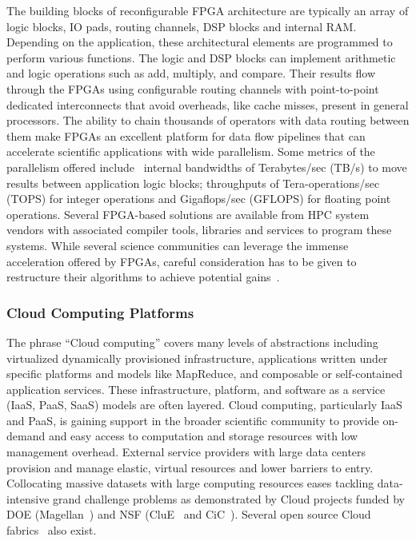 The building blocks of reconfigurable FPGA architecture are typically an array of logic blocks,
IO pads, routing channels, DSP blocks and internal RAM. Depending on the application, these
architectural elements are programmed to perform various functions. The logic and DSP blocks can
implement arithmetic and logic operations such as add, multiply, and compare. Their results flow
through the FPGAs using configurable routing channels with point-to-point dedicated interconnects
that avoid overheads, like cache misses, present in general processors. The ability to chain thousands
of operators with data routing between them make FPGAs an excellent platform for data flow
pipelines that can accelerate scientific applications with wide parallelism. 
Some metrics of the parallelism offered include~\cite{HPCFPGA} internal bandwidths of Terabytes/sec (TB/s) to move results between application logic blocks; throughputs of Tera-operations/sec (TOPS) for integer operations and Gigaflops/sec (GFLOPS) for floating point operations.
Several FPGA-based solutions are available from
HPC system vendors \cite{FPGA-Vendors} with associated 
compiler tools, libraries and services to program these systems. While several
science communities can leverage the immense acceleration offered by FPGAs, careful
consideration has to be given to restructure their algorithms to achieve potential
gains~\cite{Storaasli2007,Fu2009,Shafer2010,Convey,Baker2007,Yi2010,Putnam2009,Ganegedara2010,Hua2008}.


\subsubsection{Cloud Computing Platforms}
The phrase ``Cloud computing'' covers many levels of abstractions including virtualized dynamically
provisioned infrastructure, applications written under specific platforms and models like MapReduce,
and composable or self-contained application services. 
These infrastructure, platform, and software
as a service (IaaS, PaaS, SaaS) models are often layered. 
Cloud computing, particularly IaaS and
PaaS, is gaining support in the broader scientific community to provide on-demand and easy access
to computation and storage resources with low management overhead. 
External service providers with large data centers provision and manage elastic, 
virtual resources and lower barriers to entry.
Collocating massive datasets with large computing resources eases tackling
data-intensive grand challenge problems as demonstrated by Cloud projects
funded by DOE (Magellan~\cite{magellan}) and NSF (CluE~\cite{CluE} and
CiC~\cite{CiC}). 
Several open source Cloud fabrics~\cite{Euca, Nimbus} also exist.

